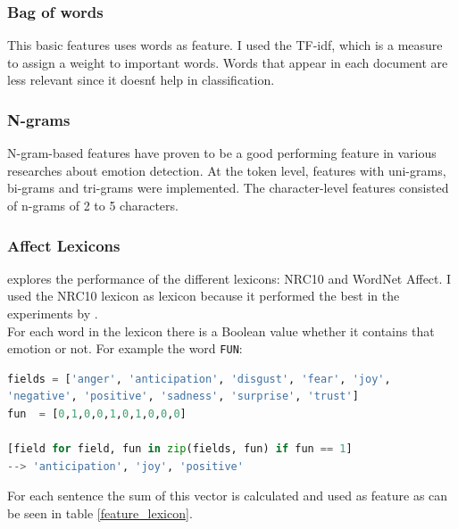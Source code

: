 \documentclass[11pt]{article}
\begin{document}
\subsubsection{Bag of words}
This basic features uses words as feature. I used the TF-idf, which is a measure to assign a weight to important words. Words that appear in each document are less relevant since it doesn\'t help in classification.

\subsubsection{N-grams}
N-gram-based features have proven to be a good performing feature in various researches about emotion detection. At the token level, features with uni-grams, bi-grams and tri-grams were implemented. The character-level features consisted of n-grams of 2 to 5 characters. 

\subsubsection{Affect Lexicons}
 explores the performance of the different lexicons: NRC10 \cite{Mohammad13} and WordNet Affect\cite{strapparava2004wordnet}. I used the NRC10 lexicon as lexicon because it performed the best in the experiments by \cite{mohammad:2012:NAACL-HLT}. \\
For each word in the lexicon there is a Boolean value whether it contains that emotion or not. For example the word \texttt{FUN}:
\begin{lstlisting}[language=python]
fields = ['anger', 'anticipation', 'disgust', 'fear', 'joy',
'negative', 'positive', 'sadness', 'surprise', 'trust']
fun  = [0,1,0,0,1,0,1,0,0,0]

[field for field, fun in zip(fields, fun) if fun == 1]
--> 'anticipation', 'joy', 'positive'
\end{lstlisting}
For each sentence the sum of this vector is calculated and used as feature as can be seen in table \ref{feature_lexicon}.
\end{document}
